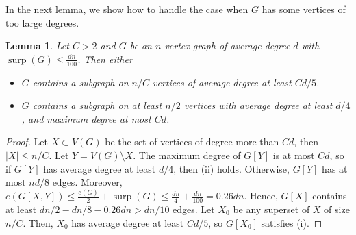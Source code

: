 \documentclass[11pt]{article}
\theoremstyle{plain}
\newtheorem{lemma}[theorem]{Lemma}
\theoremstyle{definition}
\DeclareMathOperator{\surp}{surp}
\begin{document}
In the next lemma, we show how to handle the case when $G$ has some vertices of too large degrees.

\begin{lemma}\label{lemma:dens1_high_degrees}
Let $C>2$ and $G$ be an $n$-vertex graph of average degree $d$ with $\surp(G)\leq \frac{dn}{100}$. Then either 
\begin{itemize}
    \item[(i)] $G$ contains a subgraph on $n/C$ vertices of average degree at least $Cd/5$.
    \item[(ii)]$G$ contains a subgraph on at least $n/2$ vertices with average degree at least $d/4$, and maximum degree at most $Cd$.
\end{itemize}
\end{lemma}

\begin{proof}
    Let $X\subset V(G)$ be the set of vertices of degree more than $Cd$, then $|X|\leq n/C$. 
    Let $Y=V(G)\setminus X$. 
    The maximum degree of $G[Y]$ is at most $Cd$, so if $G[Y]$ has average degree at least $d/4$, then (ii) holds.
    Otherwise, $G[Y]$ has at most $nd/8$ edges. 
    Moreover, $e(G[X,Y])\leq \frac{e(G)}{2} +\surp(G)\le \frac{dn}{4}+\frac{dn}{100} = 0.26dn$.
    Hence, $G[X]$ contains at least $dn/2-dn/8-0.26dn>dn/10$ edges. 
    Let $X_0$ be any superset of $X$ of size $n/C$.
    Then, $X_0$ has average degree at least $Cd/5$, so $G[X_0]$ satisfies (i).
\end{proof}
\end{document}
